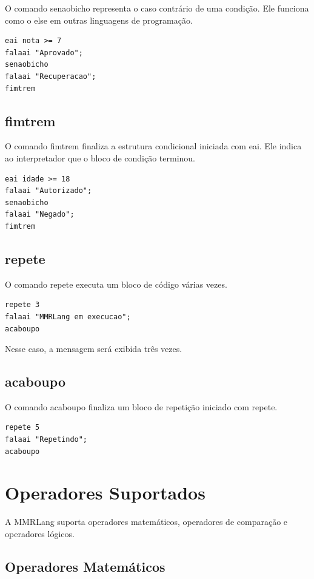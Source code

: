 \documentclass[12pt,a4paper]{article}
\begin{document}
O comando senaobicho representa o caso contrário de uma condição. Ele funciona como o else em outras linguagens de programação.

\begin{lstlisting}
eai nota >= 7
falaai "Aprovado";
senaobicho
falaai "Recuperacao";
fimtrem
\end{lstlisting}

\subsection{fimtrem}

O comando fimtrem finaliza a estrutura condicional iniciada com eai. Ele indica ao interpretador que o bloco de condição terminou.

\begin{lstlisting}
eai idade >= 18
falaai "Autorizado";
senaobicho
falaai "Negado";
fimtrem
\end{lstlisting}

\subsection{repete}

O comando repete executa um bloco de código várias vezes.

\begin{lstlisting}
repete 3
falaai "MMRLang em execucao";
acaboupo
\end{lstlisting}

Nesse caso, a mensagem será exibida três vezes.

\subsection{acaboupo}

O comando acaboupo finaliza um bloco de repetição iniciado com repete.

\begin{lstlisting}
repete 5
falaai "Repetindo";
acaboupo
\end{lstlisting}

\section{Operadores Suportados}

A MMRLang suporta operadores matemáticos, operadores de comparação e operadores lógicos.

\subsection{Operadores Matemáticos}
\end{document}
